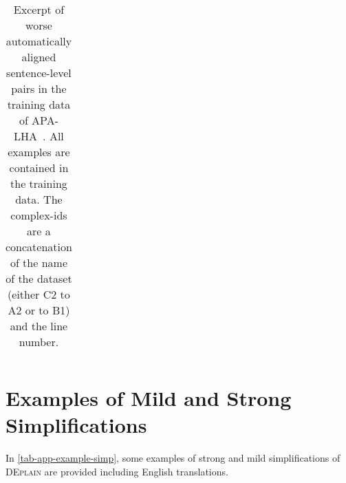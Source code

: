 \documentclass[11pt]{article}
\begin{document}
\begin{table*}
\begin{subtable}[c]{\textwidth}
{\begin{tabular}{p{3.25cm}|p{4cm}p{4.5cm}l}
\end{tabular}}
\end{subtable}


\caption{Excerpt of worse automatically aligned sentence-level pairs in the training data of APA-LHA~\cite{spring-etal-2021-exploring}.  All examples are contained in the training data. The complex-ids are a concatenation of the name of the dataset (either C2 to A2 or to B1) and the line number. }
\label{tab-exp-apa-lha}
\end{table*}





\section{Examples of Mild and Strong Simplifications}
\label{appendix-mild-strong-examples}
In \autoref{tab-app-example-simp}, some examples of strong and mild simplifications of \textsc{DEplain} are provided including English translations.
\end{document}
